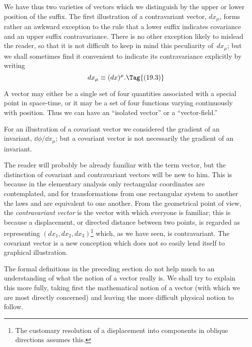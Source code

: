 \documentclass[12pt]{book}
\begin{document}
We have thus two varieties of vectors which we distinguish by the upper
or lower position of the suffix. The first illustration of a contravariant vector,
%
%
$dx_{\mu}$, forms rather an awkward exception to the rule that a lower suffix indicates
covariance and an upper suffix contravariance. There is no other
exception likely to mislead the reader, so that it is not difficult to keep in
mind this peculiarity of~$dx_{\mu}$; but we shall sometimes find it convenient to
indicate its contravariance explicitly by writing
\[
dx_{\mu} \equiv (dx)^{\mu}.
\Tag{(19.3)}
\]

A vector may either be a single set of four quantities associated with
a special point in space-time, or it may be a set of four functions varying
continuously with position. Thus we can have an ``isolated vector'' or a
``vector\hyp{}field.''

For an illustration of a covariant vector we considered the gradient of an
invariant, $\dd\phi/\dd x_{\mu}$; but a covariant vector is not necessarily the gradient of an
invariant.

The reader will probably be already familiar with the term vector, but
the distinction of covariant and contravariant vectors will be new to him.
This is because in the elementary analysis only rectangular coordinates are
contemplated, and for transformations from one rectangular system to another
the laws  and  are equivalent to one another. From the geometrical
point of view, the \emph{contravariant vector} is the vector with which everyone is
familiar; this is because a displacement, or directed distance between two
points, is regarded as representing $(dx_{1}, dx_{2}, dx_{3})$\footnote
  {The customary resolution of a displacement into components in oblique directions assumes
  this.}
which, as we have seen, is
contravariant. The covariant vector is a new conception which does not so
easily lend itself to graphical illustration.


The formal definitions in the preceding section do not help much to
an understanding of what the notion of a vector really is. We shall try to
explain this more fully, taking first the mathematical notion of a vector (with
which we are most directly concerned) and leaving the more difficult physical
notion to follow.
\end{document}
